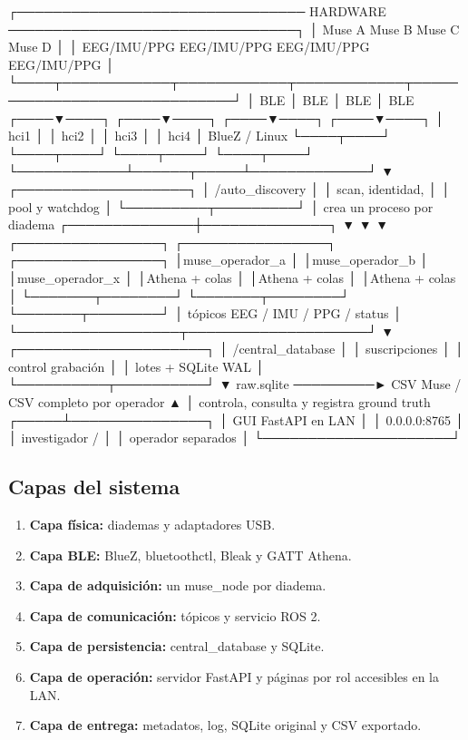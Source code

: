 \documentclass[11pt,a4paper]{article}
\begin{document}
\begin{MuseCode}
┌──────────────────────────────── HARDWARE ────────────────────────────────┐
│ Muse A       Muse B       Muse C       Muse D                           │
│ EEG/IMU/PPG  EEG/IMU/PPG  EEG/IMU/PPG  EEG/IMU/PPG                     │
└────┬────────────┬────────────┬────────────┬──────────────────────────────┘
     │ BLE        │ BLE        │ BLE        │ BLE
┌────▼────┐  ┌────▼────┐  ┌────▼────┐  ┌────▼────┐
│  hci1   │  │  hci2   │  │  hci3   │  │  hci4   │   BlueZ / Linux
└────┬────┘  └────┬────┘  └────┬────┘  └────┬────┘
     └────────────┴──────┬─────┴─────────────┘
                         ▼
               ┌───────────────────┐
               │ /auto_discovery   │
               │ scan, identidad,  │
               │ pool y watchdog   │
               └─────────┬─────────┘
                         │ crea un proceso por diadema
          ┌──────────────┼──────────────┐
          ▼              ▼              ▼
 ┌────────────────┐ ┌────────────────┐ ┌────────────────┐
 │muse_operador_a │ │muse_operador_b │ │muse_operador_x │
 │Athena + colas  │ │Athena + colas  │ │Athena + colas  │
 └───────┬────────┘ └───────┬────────┘ └───────┬────────┘
         │ tópicos EEG / IMU / PPG / status     │
         └──────────────────┬────────────────────┘
                            ▼
                 ┌─────────────────────┐
                 │ /central_database   │
                 │ suscripciones       │
                 │ control grabación   │
                 │ lotes + SQLite WAL  │
                 └──────────┬──────────┘
                            ▼
              raw.sqlite ─────────► CSV Muse / CSV completo por operador
                    ▲
                    │ controla, consulta y registra ground truth
              ┌─────┴───────────────┐
              │ GUI FastAPI en LAN  │
              │ 0.0.0.0:8765        │
              │ investigador /      │
              │ operador separados  │
              └─────────────────────┘
\end{MuseCode}

\subsection{Capas del sistema}

\begin{enumerate}
\item \textbf{Capa física:} diademas y adaptadores USB.
\item \textbf{Capa BLE:} BlueZ, {\ttfamily\small bluetoothctl}, Bleak y GATT Athena.
\item \textbf{Capa de adquisición:} un {\ttfamily\small muse\_node} por diadema.
\item \textbf{Capa de comunicación:} tópicos y servicio ROS 2.
\item \textbf{Capa de persistencia:} {\ttfamily\small central\_database} y SQLite.
\item \textbf{Capa de operación:} servidor FastAPI y páginas por rol accesibles en la LAN.
\item \textbf{Capa de entrega:} metadatos, log, SQLite original y CSV exportado.
\end{enumerate}
\end{document}
